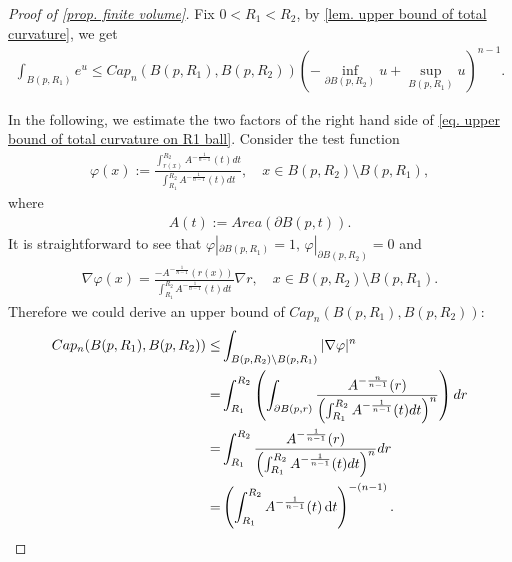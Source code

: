 \documentclass[12pt]{amsart}
\theoremstyle{plain}
\theoremstyle{definition}
\theoremstyle{remark}     %
\newcommand{\dd}{\mathop{}\!\mathrm{d}}%
\begin{document}
\begin{proof}[Proof of \cref{prop. finite volume}]
    Fix $0<R_1<R_2$, by \cref{lem. upper bound of total curvature}, we get
    \begin{align}\label{eq. upper bound of total curvature on R1 ball}
        \int_{B(p,R_1)}e^u
        \leq Cap_n(B(p,R_1), B(p,R_2))
        \left(-\inf_{\partial B(p,R_2)} u
        +\sup_{ B(p,R_1)}u\right)^{n-1}.
    \end{align}
    
    In the following, we estimate the two factors of the right hand side of \cref{eq. upper bound of total curvature on R1 ball}.
    Consider the test function
    \begin{align}\label{eq. test function varphi}
        \varphi(x):=\frac{\int_{r(x)}^{R_2}A^{-\frac{1}{n-1}}(t)dt}
        {\int_{R_1}^{R_2}A^{-\frac{1}{n-1}}(t)dt}, \quad 
        x\in B(p,R_2)\setminus B(p,R_1),
    \end{align}
    where 
    \begin{align*}
        A(t):=Area (\partial B(p,t)).
    \end{align*}
    It is straightforward to see that $\varphi|_{\partial B(p,R_1)}=1,\, \varphi|_{\partial B(p,R_2)}=0$ and
    \begin{align*}
        \nabla \varphi(x)
        =\frac{-A^{-\frac{1}{n-1}}(r(x))}{\int_{R_1}^{R_2} A^{-\frac{1}{n-1}}(t)d t}
        \nabla r,\quad
        x\in B(p,R_2)\setminus B(p,R_1).
    \end{align*}
    Therefore we could derive an upper bound of $Cap_n(B(p,R_1), B(p,R_2))$:
    \begin{align}
        Cap_n(B(p,R_1), B(p,R_2))
        \leq& \int_{B(p,R_2)\setminus B(p,R_1)}
        |\nabla \varphi|^n\notag\\
        =&\int_{R_1}^{R_2}
        \left(
        \int_{\partial B(p,r)}\frac{A^{-\frac{n}{n-1}}(r)}
        {\left(\int_{R_1}^{R_2} A^{-\frac{1}{n-1}}(t) d t\right)^n} 
        \right) d r\notag\\
        =&\int_{R_1}^{R_2}
        \frac{A^{-\frac{1}{n-1}}(r)}
        {\left(\int_{R_1}^{R_2} A^{-\frac{1}{n-1}}(t)d t\right)^n} 
        d r\notag\\
        =&
        \left(
        \int_{R_1}^{R_2} A^{-\frac{1}{n-1}}(t)\dd t
        \right)^{-(n-1)}.\label{ineq. upper bound of capacity}
    \end{align}


\end{proof}
\end{document}
